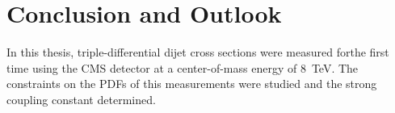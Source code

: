 
\chapter{Conclusion and Outlook}

In this thesis, triple-differential dijet cross sections were measured forthe
first time using the CMS detector at a center-of-mass energy of \SI{8}{\TeV}.
The constraints on the PDFs of this measurements were studied and the strong
coupling constant \asmz determined.


